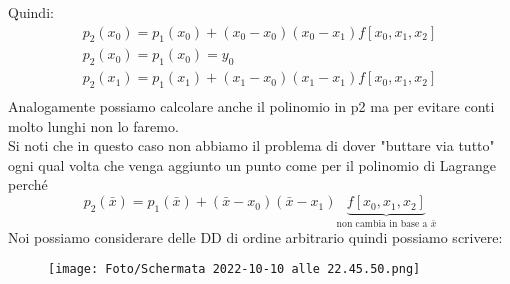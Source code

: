\documentclass[a4paper, portrait]{book}
\numberwithin{equation}{chapter} %
\begin{document}
Quindi:
\begin{gather}
    p_2(x_0) = p_1(x_0) + (x_0-x_0)(x_0-x_1)f[x_0,x_1,x_2]\\
    p_2(x_0) = p_1(x_0) = y_0\\
    p_2(x_1) = p_1(x_1) + (x_1-x_0)(x_1-x_1)f[x_0,x_1,x_2]\\
\end{gather}
Analogamente possiamo calcolare anche il polinomio in p2 ma per evitare conti molto lunghi non lo faremo.\\
Si noti che in questo caso non abbiamo il problema di dover "buttare via tutto" ogni qual volta che venga aggiunto un punto come per il polinomio di Lagrange perché
\begin{equation}
    p_2(\bar{x}) = p_1(\bar{x}) + (\bar{x} - x_0)(\bar{x}-x_1) \underbrace{f[x_0,x_1,x_2]}_{\text{non cambia in base a } \bar{x}}
\end{equation}
Noi possiamo considerare delle DD di ordine arbitrario quindi possiamo scrivere:
\begin{figure}[h!]
    \centering
    \texttt{[image: Foto/Schermata 2022-10-10 alle 22.45.50.png]}
    \caption{}
\end{figure}
\end{document}
